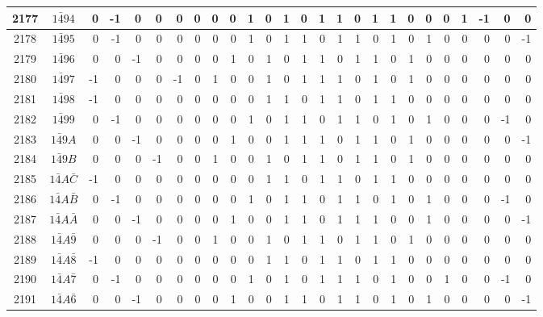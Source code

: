 \documentclass[12 pt]{article}%
\begin{document}
\begin{tiny}
\begin{centering}
\begin{longtable}{|c|c||rrrrrrrrrrrrrrrrrrrrrrrr|}
      \hline
      2177 & $1\bar494$ & 0 & -1 & 0 & 0 & 0 & 0 & 0 & 0 & 1 & 0 & 1 & 0 & 1 & 1 & 0 & 1 & 1 & 0 & 0 & 0 & 1 & -1 & 0 & 0 \\
      \hline
      2178 & $1\bar495$ & 0 & -1 & 0 & 0 & 0 & 0 & 0 & 0 & 1 & 0 & 1 & 1 & 0 & 1 & 1 & 0 & 1 & 0 & 1 & 0 & 0 & 0 & 0 & -1 \\
      \hline
      2179 & $1\bar496$ & 0 & 0 & -1 & 0 & 0 & 0 & 0 & 1 & 0 & 1 & 0 & 1 & 1 & 0 & 1 & 1 & 0 & 1 & 0 & 0 & 0 & 0 & 0 & 0 \\
      \hline
      2180 & $1\bar497$ & -1 & 0 & 0 & 0 & -1 & 0 & 1 & 0 & 0 & 1 & 0 & 1 & 1 & 1 & 0 & 1 & 0 & 1 & 0 & 0 & 0 & 0 & 0 & 0 \\
      \hline
      2181 & $1\bar498$ & -1 & 0 & 0 & 0 & 0 & 0 & 0 & 0 & 0 & 1 & 1 & 0 & 1 & 1 & 0 & 1 & 1 & 0 & 0 & 0 & 0 & 0 & 0 & 0 \\
      \hline
      2182 & $1\bar499$ & 0 & -1 & 0 & 0 & 0 & 0 & 0 & 0 & 1 & 0 & 1 & 1 & 0 & 1 & 1 & 0 & 1 & 0 & 1 & 0 & 0 & 0 & -1 & 0 \\
      \hline
      2183 & $1\bar49A$ & 0 & 0 & -1 & 0 & 0 & 0 & 0 & 1 & 0 & 0 & 1 & 1 & 1 & 0 & 1 & 1 & 0 & 1 & 0 & 0 & 0 & 0 & 0 & -1 \\
      \hline
      2184 & $1\bar49B$ & 0 & 0 & 0 & -1 & 0 & 0 & 1 & 0 & 0 & 1 & 0 & 1 & 1 & 0 & 1 & 1 & 0 & 1 & 0 & 0 & 0 & 0 & 0 & 0 \\
      \hline
      2185 & $1\bar4A\bar C$ & -1 & 0 & 0 & 0 & 0 & 0 & 0 & 0 & 0 & 1 & 1 & 0 & 1 & 1 & 0 & 1 & 1 & 0 & 0 & 0 & 0 & 0 & 0 & 0 \\
      \hline
      2186 & $1\bar4A\bar B$ & 0 & -1 & 0 & 0 & 0 & 0 & 0 & 0 & 1 & 0 & 1 & 1 & 0 & 1 & 1 & 0 & 1 & 0 & 1 & 0 & 0 & 0 & -1 & 0 \\
      \hline
      2187 & $1\bar4A\bar A$ & 0 & 0 & -1 & 0 & 0 & 0 & 0 & 1 & 0 & 0 & 1 & 1 & 0 & 1 & 1 & 1 & 0 & 0 & 1 & 0 & 0 & 0 & 0 & -1 \\
      \hline
      2188 & $1\bar4A\bar9$ & 0 & 0 & 0 & -1 & 0 & 0 & 1 & 0 & 0 & 1 & 0 & 1 & 1 & 0 & 1 & 1 & 0 & 1 & 0 & 0 & 0 & 0 & 0 & 0 \\
      \hline
      2189 & $1\bar4A\bar8$ & -1 & 0 & 0 & 0 & 0 & 0 & 0 & 0 & 0 & 1 & 1 & 0 & 1 & 1 & 0 & 1 & 1 & 0 & 0 & 0 & 0 & 0 & 0 & 0 \\
      \hline
      2190 & $1\bar4A\bar7$ & 0 & -1 & 0 & 0 & 0 & 0 & 0 & 0 & 1 & 0 & 1 & 0 & 1 & 1 & 1 & 0 & 1 & 0 & 0 & 1 & 0 & 0 & -1 & 0 \\
      \hline
      2191 & $1\bar4A\bar6$ & 0 & 0 & -1 & 0 & 0 & 0 & 0 & 1 & 0 & 0 & 1 & 1 & 0 & 1 & 1 & 0 & 1 & 0 & 1 & 0 & 0 & 0 & 0 & -1 \\

\end{longtable}
\end{centering}
\end{tiny}
\end{document}
